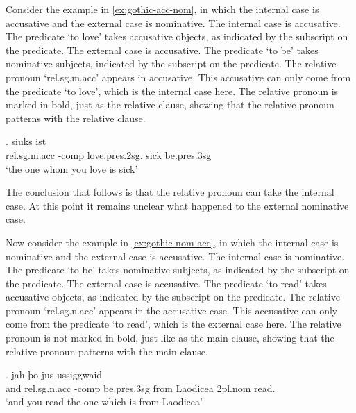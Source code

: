 Consider the example in \ref{ex:gothic-acc-nom}, in which the internal case is accusative and the external case is nominative.
The internal case is accusative. The predicate  `to love' takes accusative objects, as indicated by the subscript on the predicate.
The external case is accusative. The predicate  `to be' takes nominative subjects, indicated by the subscript on the predicate.
The relative pronoun  `\ac{rel}.\ac{sg}.\ac{m}.\ac{acc}' appears in accusative. This accusative can only come from the predicate  `to love', which is the internal case here. The relative pronoun is marked in bold, just as the relative clause, showing that the relative pronoun patterns with the relative clause.

\exg.    siuks ist\\
 \ac{rel}.\ac{sg}.\ac{m}.\ac{acc} -\ac{comp} love.\ac{pres}.2\ac{sg}.\scsub{[acc]} sick be.\ac{pres}.3\ac{sg}\scsub{[nom]}\\
 `the one whom you love is sick' \label{ex:gothic-acc-nom}

The conclusion that follows is that the relative pronoun can take the internal case. At this point it remains unclear what happened to the external nominative case.

Now consider the example in \ref{ex:gothic-nom-acc}, in which the internal case is nominative and the external case is accusative.
The internal case is nominative. The predicate  `to be' takes nominative subjects, as indicated by the subscript on the predicate.
The external case is accusative. The predicate  `to read' takes accusative objects, as indicated by the subscript on the predicate.
The relative pronoun  `\ac{rel}.\ac{sg}.\ac{n}.\ac{acc}' appears in the accusative case. This accusative can only come from the predicate  `to read', which is the external case here. The relative pronoun is not marked in bold, just like as the main clause, showing that the relative pronoun patterns with the main clause.

\exg. jah þo     jus ussiggwaid\\
 and \ac{rel}.\ac{sg}.\ac{n}.\ac{acc} -\ac{comp} be.\ac{pres}.3\ac{sg}\scsub{[nom]} from Laodicea 2\ac{pl}.\ac{nom} read.\scsub{[acc]}\\
 `and you read the one which is from Laodicea' \label{ex:gothic-nom-acc}


